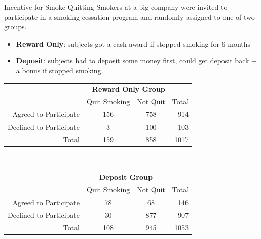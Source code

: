 \documentclass[
  ignorenonframetext, 10pt
]{beamer}
\providecommand{\tightlist}{%
  \setlength{\itemsep}{0pt}\setlength{\parskip}{0pt}}
\begin{document}
\begin{frame}{Incentive for Smoke Quitting}
\protect\hypertarget{incentive-for-smoke-quitting}{}
Smokers at a big company were invited to participate in a smoking
cessation program and randomly assigned to one of two groups.

\begin{itemize}
\tightlist
\item
  \textbf{Reward Only}: subjects got a cash award if stopped smoking for
  6 months
\item
  \textbf{Deposit}: subjects had to deposit some money first, could get
  deposit back + a bonus if stopped smoking.
\end{itemize}

\begin{center}
\begin{tabular}{@{}r|cc|r}
\multicolumn{1}{c}{}&\multicolumn{2}{r}{\textbf{\large Reward Only Group}} \\
\multicolumn{1}{c}{}& Quit Smoking & Not Quit & Total\\\hline
  Agreed to Participate & 156 & 758 & 914\\
Declined to Participate &   3 & 100 & 103\\\hline
Total & 159 & 858 & 1017
\end{tabular}\\[5pt]
\begin{tabular}{@{}r|cc|r@{}}
\multicolumn{1}{c}{}&\multicolumn{2}{c}{\textbf{\large Deposit Group}}& \\
\multicolumn{1}{c}{}& Quit Smoking & Not Quit & Total\\\hline
  Agreed to Participate & 78 &  68 & 146\\
Declined to Participate & 30 & 877 & 907\\\hline
Total & 108 & 945 & 1053
\end{tabular}
\end{center}
\end{frame}
\end{document}
